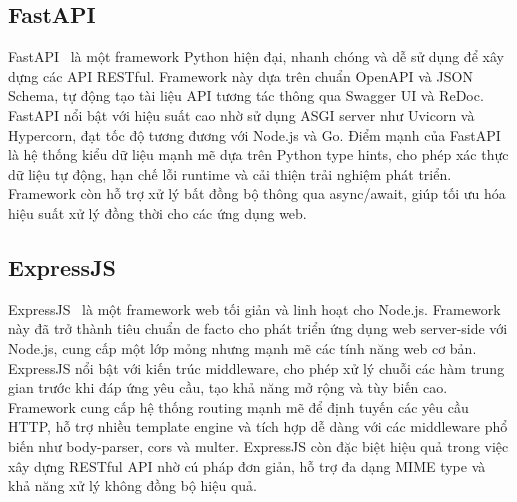 \subsection{FastAPI}
FastAPI~\cite{fastapidoc} là một framework Python hiện đại, nhanh chóng và dễ sử dụng để xây dựng các API RESTful. Framework này dựa trên chuẩn OpenAPI và JSON Schema, tự động tạo tài liệu API tương tác thông qua Swagger UI và ReDoc. FastAPI nổi bật với hiệu suất cao nhờ sử dụng ASGI server như Uvicorn và Hypercorn, đạt tốc độ tương đương với Node.js và Go. Điểm mạnh của FastAPI là hệ thống kiểu dữ liệu mạnh mẽ dựa trên Python type hints, cho phép xác thực dữ liệu tự động, hạn chế lỗi runtime và cải thiện trải nghiệm phát triển. Framework còn hỗ trợ xử lý bất đồng bộ thông qua async/await, giúp tối ưu hóa hiệu suất xử lý đồng thời cho các ứng dụng web. 

\subsection{ExpressJS}
ExpressJS~\cite{expressjsdoc} là một framework web tối giản và linh hoạt cho Node.js. Framework này đã trở thành tiêu chuẩn de facto cho phát triển ứng dụng web server-side với Node.js, cung cấp một lớp mỏng nhưng mạnh mẽ các tính năng web cơ bản. ExpressJS nổi bật với kiến trúc middleware, cho phép xử lý chuỗi các hàm trung gian trước khi đáp ứng yêu cầu, tạo khả năng mở rộng và tùy biến cao. Framework cung cấp hệ thống routing mạnh mẽ để định tuyến các yêu cầu HTTP, hỗ trợ nhiều template engine và tích hợp dễ dàng với các middleware phổ biến như body-parser, cors và multer. ExpressJS còn đặc biệt hiệu quả trong việc xây dựng RESTful API nhờ cú pháp đơn giản, hỗ trợ đa dạng MIME type và khả năng xử lý không đồng bộ hiệu quả.